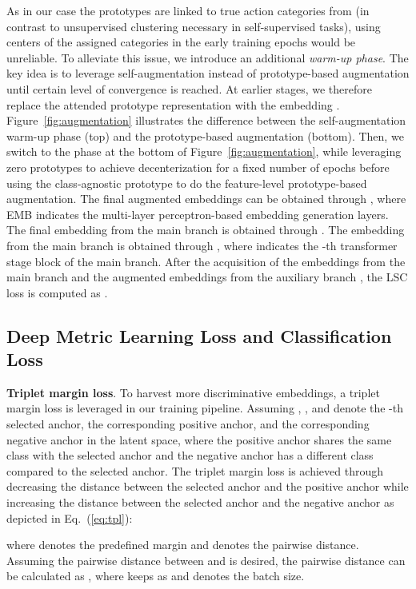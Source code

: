 \documentclass[lettersize,journal]{IEEEtran}
\newcommand{\mypar}[1]{\vspace{0.1cm}\noindent\textbf{#1}.}
\begin{document}
As in our case the prototypes are linked to true action categories from  (in contrast to unsupervised clustering necessary in self-supervised tasks), using centers of the assigned categories in the early training epochs would be unreliable. To alleviate this issue, we introduce an additional \textit{warm-up phase}. The key idea is to leverage self-augmentation instead of prototype-based augmentation until certain level of convergence is reached. At earlier stages, we therefore replace the attended prototype representation with the embedding . Figure~\ref{fig:augmentation} illustrates the difference between the self-augmentation warm-up phase (top) and the prototype-based augmentation (bottom). Then, we switch to the phase at the bottom of Figure~\ref{fig:augmentation}, while leveraging zero prototypes to achieve decenterization for a fixed number of epochs before using the class-agnostic prototype to do the feature-level prototype-based augmentation.
The final augmented embeddings  can be obtained through , where EMB indicates the multi-layer perceptron-based embedding generation layers. The final embedding from the main branch is obtained through . The embedding  from the main branch is obtained through  , where  indicates the -th transformer stage block of the main branch.
After the acquisition of the embeddings from the main branch  and the augmented embeddings from the auxiliary branch , the LSC loss is computed as .

\subsection{Deep Metric Learning Loss and Classification Loss}
\mypar{Triplet margin loss} To harvest more discriminative embeddings, a triplet margin loss is leveraged in our training pipeline.
Assuming , , and  denote the -th selected anchor, the corresponding positive anchor, and the corresponding negative anchor in the latent space, where the positive anchor shares the same class with the selected anchor and the negative anchor has a different class compared to the selected anchor.
The triplet margin loss is achieved through decreasing the distance between the selected anchor and the positive anchor while increasing the distance between the selected anchor and the negative anchor as depicted in Eq.~(\ref{eq:tpl}):

where  denotes the predefined margin and  denotes the pairwise distance. Assuming the pairwise distance between  and  is desired, the pairwise distance can be calculated as , where  keeps as  and  denotes the batch size.
\end{document}
